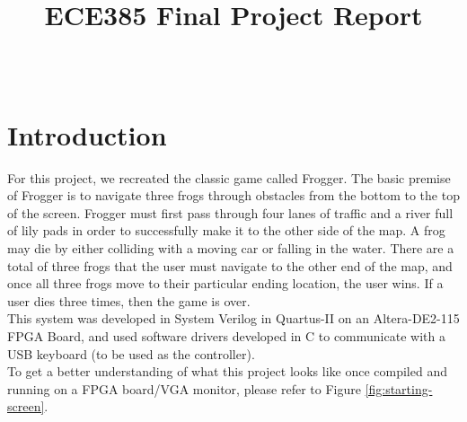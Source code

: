 \documentclass[journal, twocolumn, final,11pt,letterpaper]{IEEEtran}
\title{ECE385 Final Project Report
	}
\author{
\IEEEauthorblockN{Frogger in System Verilog\\ Eric Meyers, Ryan Helsdingen}\\
\IEEEauthorblockA{Section ABG; TAs: Ben Delay, Shuo Liu \\
May 4th, 2016 \\
emeyer7, helsdin2}}
\begin{document}
	
\maketitle
\singlespacing

\section{Introduction}
For this project, we recreated the classic game called Frogger.  The basic premise of Frogger is to navigate three frogs through obstacles from the bottom to the top of the screen. Frogger must first pass through four lanes of traffic and a river full of lily pads in order to successfully make it to the other side of the map.  A frog may die by either colliding with a moving car or falling in the water. There are a total of three frogs that the user must navigate to the other end of the map, and once all three frogs move to their particular ending location, the user wins. If a user dies three times, then the game is over.\\

This system was developed in System Verilog in Quartus-II on an Altera-DE2-115 FPGA Board, and used software drivers developed in C to communicate with a USB keyboard (to be used as the controller).\\

To get a better understanding of what this project looks like once compiled and running on a FPGA board/VGA monitor, please refer to Figure \ref{fig:starting-screen}.

\end{document}
